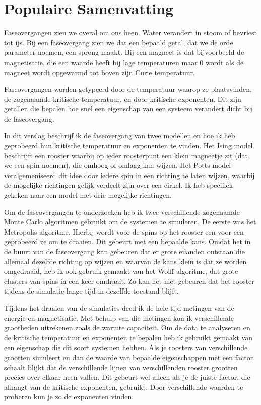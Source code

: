 \documentclass[11pt, a4paper]{report} %
\begin{document}
\newpage
\thispagestyle{plain}
\section*{Populaire Samenvatting}
Faseovergangen zien we overal om ons heen. Water verandert in stoom of bevriest tot ijs.
Bij een faseovergang zien we dat een bepaald getal, dat we de orde parameter noemen, een sprong maakt.
Bij een magneet is dat bijvoorbeeld de magnetisatie, die een waarde heeft bij lage temperaturen maar 0 wordt als de magneet wordt opgewarmd tot boven zijn Curie temperatuur.

Faseovergangen worden getypeerd door de temperatuur waarop ze plaatsvinden, de zogenaamde kritische temperatuur, en door kritische exponenten.
Dit zijn getallen die bepalen hoe snel een eigenschap van een systeem verandert dicht bij de faseovergang.

In dit verslag beschrijf ik de faseovergang van twee modellen en hoe ik heb geprobeerd hun kritische temperatuur en exponenten te vinden.
Het Ising model beschrijft een rooster waarbij op ieder roosterpunt een klein magneetje zit (dat we een spin noemen), die omhoog of omlaag kan wijzen.
Het Potts model veralgemeniseerd dit idee door iedere spin in een richting te laten wijzen, waarbij de mogelijke richtingen gelijk verdeelt zijn over een cirkel.
Ik heb specifiek gekeken naar een model met drie mogelijke richtingen.

Om de faseovergangen te onderzoeken heb ik twee verschillende zogenaamde Monte Carlo algoritmen gebruikt om de systemen te simuleren.
De eerste was het Metropolis algoritme.
Hierbij wordt voor de spins op het rooster een voor een geprobeerd ze om te draaien. Dit gebeurt met een bepaalde kans.
Omdat het in de buurt van de faseovergang kan gebeuren dat er grote eilanden ontstaan die allemaal dezelfde richting op wijzen en waarvan de kans klein is dat ze worden omgedraaid, heb ik ook gebruik gemaakt van het Wolff algoritme, dat grote clusters van spins in een keer omdraait.
Zo kan het niet gebeuren dat het rooster tijdens de simulatie lange tijd in dezelfde toestand blijft.

Tijdens het draaien van de simulaties deed ik de hele tijd metingen van de energie en magnetisatie.
Met behulp van die metingen kon ik verschillende grootheden uitrekenen zoals de warmte capaciteit.
Om de data te analyseren en de kritische temperatuur en exponenten te bepalen  heb ik gebruikt gemaakt van een eigenschap die dit soort systemen hebben.
Als je roosters van verschillende grootten simuleert en dan de waarde van bepaalde eigenschappen met een factor schaalt blijkt dat de verschillende lijnen van verschillenden rooster grootten precies over elkaar heen vallen.
Dit gebeurt wel alleen als je de juiste factor, die afhangt van de kritische exponenten, gebruikt.
Door verschillende waarden te proberen kun je zo de exponenten vinden.
\end{document}
